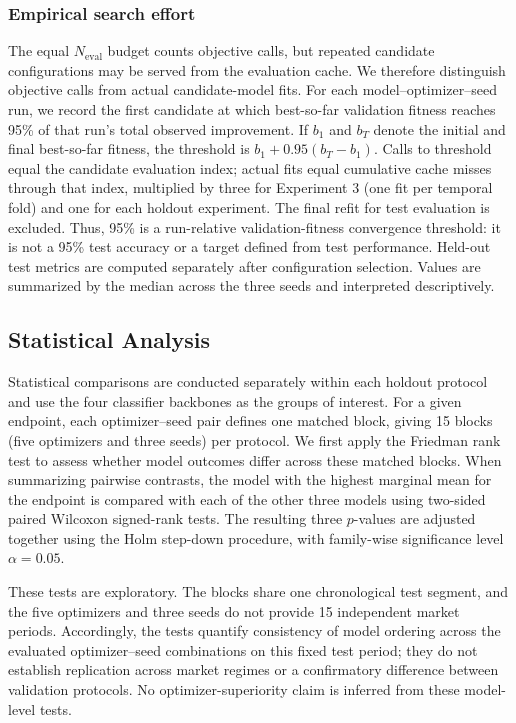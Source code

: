 \subsubsection{Empirical search effort}
\label{sec:empirical_effort}
The equal $N_{\mathrm{eval}}$ budget counts objective calls, but repeated candidate configurations may be served from the evaluation cache. We therefore distinguish objective calls from actual candidate-model fits. For each model--optimizer--seed run, we record the first candidate at which best-so-far validation fitness reaches 95\% of that run's total observed improvement. If $b_1$ and $b_T$ denote the initial and final best-so-far fitness, the threshold is $b_1+0.95(b_T-b_1)$. Calls to threshold equal the candidate evaluation index; actual fits equal cumulative cache misses through that index, multiplied by three for Experiment 3 (one fit per temporal fold) and one for each holdout experiment. The final refit for test evaluation is excluded. Thus, 95\% is a run-relative validation-fitness convergence threshold: it is not a 95\% test accuracy or a target defined from test performance. Held-out test metrics are computed separately after configuration selection. Values are summarized by the median across the three seeds and interpreted descriptively.

\subsection{Statistical Analysis}
\label{sec:statistical_analysis}

Statistical comparisons are conducted separately within each holdout protocol and use the four classifier backbones as the groups of interest. For a given endpoint, each optimizer--seed pair defines one matched block, giving 15 blocks (five optimizers and three seeds) per protocol. We first apply the Friedman rank test to assess whether model outcomes differ across these matched blocks. When summarizing pairwise contrasts, the model with the highest marginal mean for the endpoint is compared with each of the other three models using two-sided paired Wilcoxon signed-rank tests. The resulting three $p$-values are adjusted together using the Holm step-down procedure, with family-wise significance level $\alpha=0.05$.

These tests are exploratory. The blocks share one chronological test segment, and the five optimizers and three seeds do not provide 15 independent market periods. Accordingly, the tests quantify consistency of model ordering across the evaluated optimizer--seed combinations on this fixed test period; they do not establish replication across market regimes or a confirmatory difference between validation protocols. No optimizer-superiority claim is inferred from these model-level tests.
